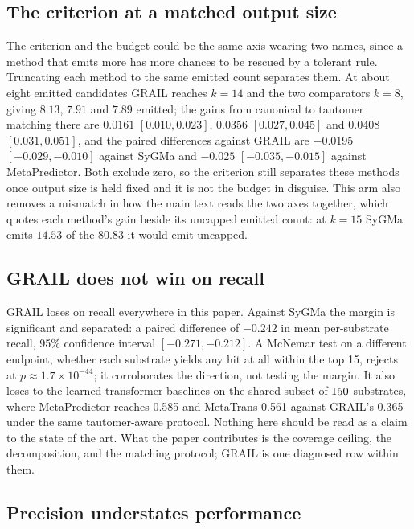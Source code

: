 \subsection{The criterion at a matched output size}
\label{app:matchedemission}

The criterion and the budget could be the same axis wearing two names, since a method that emits
more has more chances to be rescued by a tolerant rule. Truncating each method to the same emitted
count separates them. At about eight emitted candidates GRAIL reaches $k=14$ and the two comparators
$k=8$, giving $8.13$, $7.91$ and $7.89$ emitted; the gains from canonical to tautomer matching there
are $0.0161$ $[0.010,0.023]$, $0.0356$ $[0.027,0.045]$ and $0.0408$ $[0.031,0.051]$, and the paired
differences against GRAIL are $-0.0195$ $[-0.029,-0.010]$ against SyGMa and $-0.025$
$[-0.035,-0.015]$ against MetaPredictor. Both exclude zero, so the criterion still separates these
methods once output size is held fixed and it is not the budget in disguise. This arm also removes a
mismatch in how the main text reads the two axes together, which quotes each method's gain beside
its uncapped emitted count: at $k=15$ SyGMa emits $14.53$ of the $80.83$ it would emit uncapped.

\subsection{GRAIL does not win on recall}

GRAIL loses on recall everywhere in this paper. Against SyGMa the margin is significant and separated: a paired difference of $-0.242$ in mean per-substrate recall, 95\%
confidence interval $[-0.271,-0.212]$. A McNemar test on a different endpoint, whether each
substrate yields any hit at all within the top 15, rejects at $p\approx1.7\times10^{-44}$; it
corroborates the direction, not testing the margin. It also loses to the learned transformer baselines
on the shared subset of $150$ substrates, where MetaPredictor reaches 0.585 and MetaTrans
0.561 against GRAIL's 0.365 under the same tautomer-aware protocol. Nothing here should be read
as a claim to the state of the art. What the paper contributes is the coverage ceiling, the
decomposition, and the matching protocol; GRAIL is one diagnosed row within them.

\subsection{Precision understates performance}

